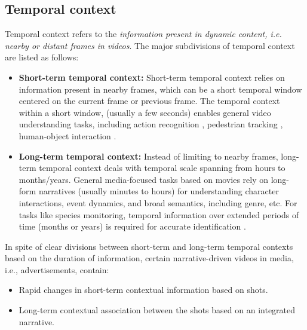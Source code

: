 \subsection{Temporal context}
Temporal context refers to the \textit{information present in dynamic content, i.e. nearby or distant frames in videos}. The major subdivisions of temporal context are listed as follows:
\begin{itemize}
\item \textbf{Short-term temporal context:} Short-term temporal context relies on information present in nearby frames, which can be a short temporal window centered on the current frame or previous frame. The temporal context within a short window, (usually a few seconds) enables general video understanding tasks, including action recognition \cite{Carreira2017QuoVA}, pedestrian tracking \cite{Yan2019LearningCG}, human-object interaction \cite{Ji2021DetectingHR}. 
\item \textbf{Long-term temporal context:} Instead of limiting to nearby frames, long-term temporal context deals with temporal scale spanning from hours to months/years. General media-focused tasks based on movies \cite{Wu2021TowardsLV,Soldan2021MADAS} rely on long-form narratives (usually minutes to hours) for understanding character interactions, event dynamics, and broad semantics, including genre, etc. For tasks like species monitoring, temporal information over extended periods of time (months or years) is required for accurate identification \cite{Beery2019ContextRL}. 
\end{itemize}
In spite of clear divisions between short-term and long-term temporal contexts based on the duration of information, certain narrative-driven videos in media, i.e., advertisements, contain: 
\begin{itemize}
\item Rapid changes in short-term contextual information based on shots. 
\item Long-term contextual association between the shots based on an integrated narrative.
\end{itemize}
